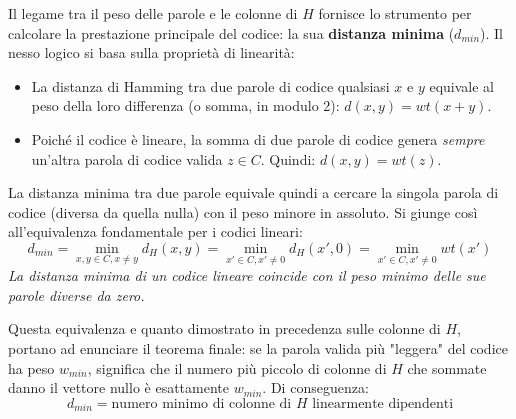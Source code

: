 Il legame tra il peso delle parole e le colonne di $H$ fornisce lo strumento per calcolare la prestazione principale del codice: la sua \textbf{distanza minima} ($d_{min}$).
Il nesso logico si basa sulla proprietà di linearità:
\begin{itemize}
    \item La distanza di Hamming tra due parole di codice qualsiasi $x$ e $y$ equivale al peso della loro differenza (o somma, in modulo 2): $d(x,y) = wt(x+y)$.
    \item Poiché il codice è lineare, la somma di due parole di codice genera \textit{sempre} un'altra parola di codice valida $z \in C$. Quindi: $d(x,y) = wt(z)$.
\end{itemize}

La distanza minima tra due parole equivale quindi a cercare la singola parola di codice (diversa da quella nulla) con il peso minore in assoluto. Si giunge così all'equivalenza fondamentale per i codici lineari:
\[ d_{min} = \min_{x,y\in C,x \neq y}{d_H(x,y)}=\min_{x'\in C,x' \neq 0}{d_H(x',0)} = \min_{x'\in C,x' \neq 0}{wt(x')} \]
\textit{La distanza minima di un codice lineare coincide con il peso minimo delle sue parole diverse da zero.}

Questa equivalenza e quanto dimostrato in precedenza sulle colonne di $H$, portano ad  enunciare il teorema finale:
se la parola valida più "leggera" del codice ha peso $w_{min}$, significa che il numero più piccolo di colonne di $H$ che sommate danno il vettore nullo è esattamente $w_{min}$.
Di conseguenza:
\[ d_{min} = \text{numero minimo di colonne di } H \text{ linearmente dipendenti} \]


